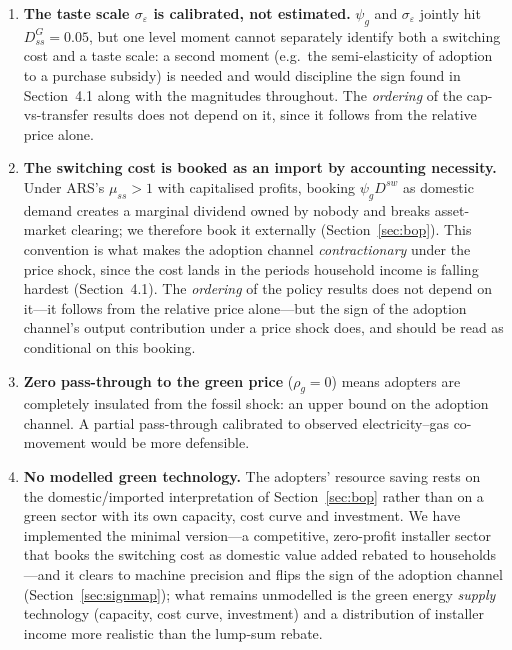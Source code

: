 \documentclass[11pt,a4paper]{article}
\begin{document}
\begin{enumerate}\itemsep3pt

\item \textbf{The taste scale $\sigma_{\varepsilon}$ is calibrated, not
estimated.} $\psi_g$ and $\sigma_\varepsilon$ jointly hit $D^G_{ss}=0.05$, but
one level moment cannot separately identify both a switching cost and a taste
scale: a second moment (e.g.\ the semi-elasticity of adoption to a purchase
subsidy) is needed and would discipline the sign found in
Section~4.1 along with the magnitudes throughout. The \emph{ordering} of the
cap-vs-transfer results does not depend on it, since it follows from the
relative price alone.

\item \textbf{The switching cost is booked as an import by accounting
necessity.} Under ARS's $\mu_{ss}>1$ with capitalised profits, booking
$\psi_g D^{sw}$ as domestic demand creates a marginal dividend owned by nobody
and breaks asset-market clearing; we therefore book it externally
(Section~\ref{sec:bop}). This convention is what makes the adoption channel
\emph{contractionary} under the price shock, since the cost lands in the
periods household income is falling hardest (Section~4.1). The \emph{ordering}
of the policy results does not depend on it---it follows from the relative
price alone---but the sign of the adoption channel's output contribution under
a price shock does, and should be read as conditional on this booking.

\item \textbf{Zero pass-through to the green price} ($\rho_g=0$) means
adopters are completely insulated from the fossil shock: an upper bound on
the adoption channel. A partial pass-through calibrated to observed
electricity--gas co-movement would be more defensible.

\item \textbf{No modelled green technology.} The adopters' resource saving
rests on the domestic/imported interpretation of Section~\ref{sec:bop} rather
than on a green sector with its own capacity, cost curve and investment. We
have implemented the minimal version---a competitive, zero-profit installer
sector that books the switching cost as domestic value added rebated to
households---and it clears to machine precision and flips the sign of the
adoption channel (Section~\ref{sec:signmap}); what remains unmodelled is the
green energy \emph{supply} technology (capacity, cost curve, investment) and a
distribution of installer income more realistic than the lump-sum rebate.


\end{enumerate}
\end{document}
